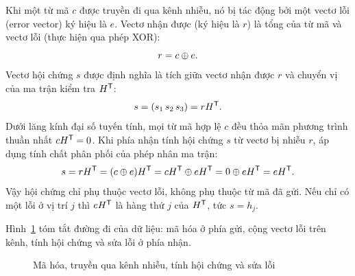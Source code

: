 Khi một từ mã $c$ được truyền đi qua kênh nhiễu, nó
bị tác động bởi một vectơ lỗi (error vector) ký hiệu là $e$. Vectơ nhận được
(ký hiệu là $r$) là tổng của từ mã và vectơ lỗi (thực hiện qua phép XOR):
\[
  r = c \oplus e .
\]
Vectơ hội chứng $s$ được định nghĩa là tích giữa vectơ nhận được $r$ và chuyển
vị của ma trận kiểm tra $H^{\mathsf{T}}$:
\[
  s = (s_1\,s_2\,s_3) = rH^{\mathsf{T}} .
\]
Dưới lăng kính đại số tuyến tính, mọi từ mã hợp lệ $c$ đều thỏa mãn phương
trình thuần nhất $cH^{\mathsf{T}} = 0$. Khi phía nhận tính hội chứng $s$ từ vectơ bị nhiễu
$r$, áp dụng tính chất phân phối của phép nhân ma trận:
\begin{equation}\label{eq:hoichung}
  s = rH^{\mathsf{T}} = (c \oplus e)H^{\mathsf{T}} = cH^{\mathsf{T}} \oplus eH^{\mathsf{T}} = 0 \oplus eH^{\mathsf{T}} = eH^{\mathsf{T}} .
\end{equation}
Vậy hội chứng chỉ phụ thuộc vectơ lỗi, không phụ thuộc từ mã đã gửi. Nếu chỉ
có một lỗi ở vị trí $j$ thì $eH^{\mathsf{T}}$ là hàng thứ $j$ của $H^{\mathsf{T}}$, tức $s = h_j$.

Hình~\ref{fig:sodo} tóm tắt đường đi của dữ liệu: mã hóa ở phía gửi, cộng
vectơ lỗi trên kênh, tính hội chứng và sửa lỗi ở phía nhận.

\begin{figure}[H]
\centering
{}
\caption{Mã hóa, truyền qua kênh nhiễu, tính hội chứng và sửa lỗi}
\label{fig:sodo}
\end{figure}

